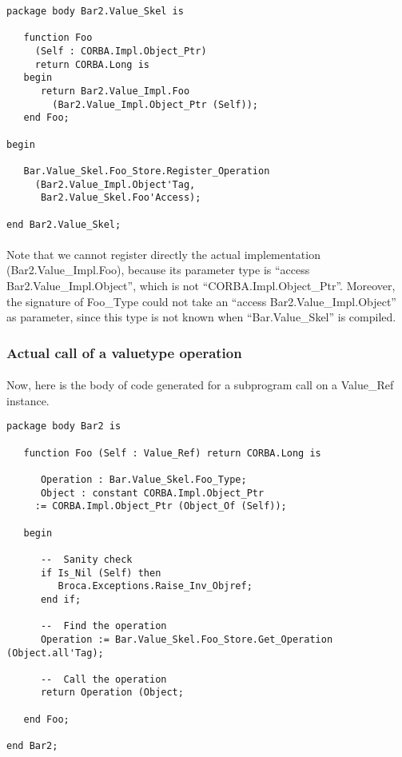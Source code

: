 \begin{verbatim}
package body Bar2.Value_Skel is

   function Foo
     (Self : CORBA.Impl.Object_Ptr)
     return CORBA.Long is
   begin
      return Bar2.Value_Impl.Foo
        (Bar2.Value_Impl.Object_Ptr (Self));
   end Foo;

begin
	
   Bar.Value_Skel.Foo_Store.Register_Operation
     (Bar2.Value_Impl.Object'Tag,
      Bar2.Value_Skel.Foo'Access);

end Bar2.Value_Skel;
\end{verbatim}

\paragraph{} Note that we cannot register directly the actual
implementation (Bar2.Value\_Impl.Foo), because its parameter type is
``access Bar2.Value\_Impl.Object'', which is not
``CORBA.Impl.Object\_Ptr''. Moreover, the signature of Foo\_Type could
not take an ``access Bar2.Value\_Impl.Object'' as parameter, since
this type is not known when ``Bar.Value\_Skel'' is compiled.

\subsubsection{Actual call of a valuetype operation}
\paragraph{}Now, here is the body of code generated for a subprogram
call on a Value\_Ref instance.

\begin{verbatim}
package body Bar2 is

   function Foo (Self : Value_Ref) return CORBA.Long is

      Operation : Bar.Value_Skel.Foo_Type;
      Object : constant CORBA.Impl.Object_Ptr
	 := CORBA.Impl.Object_Ptr (Object_Of (Self));

   begin

      --  Sanity check
      if Is_Nil (Self) then
         Broca.Exceptions.Raise_Inv_Objref;
      end if;

      --  Find the operation
      Operation := Bar.Value_Skel.Foo_Store.Get_Operation (Object.all'Tag);

      --  Call the operation
      return Operation (Object;

   end Foo;

end Bar2;
\end{verbatim}

